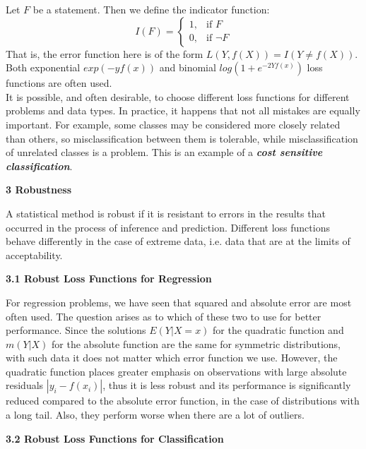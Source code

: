 \documentclass[12pt, letterpaper, twoside]{article}
\begin{document}
\hspace*{4ex} Let $F$ be a statement. Then we define the indicator function: \[
    I(F)=
\begin{cases}
    1,& \text{if } F\\
    0,& \text{if }   \neg F
\end{cases}
\]
That is, the error function here is of the form \(L(Y,f(X)) = I(Y \neq f(X)) \). Both exponential $exp(-yf(x))$ and binomial $log(1+e^{-2Yf(x)})$ loss functions are often used.\\
\hspace*{4ex} It is possible, and often desirable, to choose different loss functions for different problems and data types. In practice, it happens that not all mistakes are equally important. For example, some classes may be considered more closely related than others, so misclassification between them is tolerable, while misclassification of unrelated classes is a problem. This is an example of a \textbf{\textit{cost sensitive classification}}.
\pagebreak

\begin{center}
\textbf{\large{3 Robustness}} 
\end{center}
\hspace*{4ex} A statistical method is robust if it is resistant to errors in the results that occurred in the process of inference and prediction. Different loss functions behave differently in the case of extreme data, i.e. data that are at the limits of acceptability.\\
\begin{center}
\textbf{\large{3.1 Robust Loss Functions for Regression}}
\end{center}

\hspace*{4ex} For regression problems, we have seen that squared and absolute error are most often used. The question arises as to which of these two to use for better performance. Since the solutions $E(Y|X = x)$ for the quadratic function and $m(Y|X)$ for the absolute function are the same for symmetric distributions, with such data it does not matter which error function we use. However, the quadratic function places greater emphasis on observations with large absolute residuals $|y_i − f(x_i)|$, thus it is less robust and its performance is significantly reduced compared to the absolute error function, in the case of distributions with a long tail. Also, they perform worse when there are a lot of outliers.\\
\begin{center}
\textbf{\large{3.2 Robust Loss Functions for Classification}}
\end{center}
\end{document}
